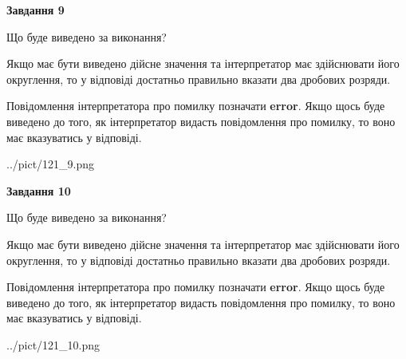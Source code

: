 \documentclass[12pt, ukrainian]{article}
\begin{document}
{\begin {Large}
{\begin {center}\textbf{Завдання 9}\end {center}}\par
Що буде виведено за виконання? \par

Якщо має бути виведено дійсне значення та інтерпретатор має здійснювати його округлення, 
то у відповіді достатньо правильно вказати два дробових розряди.

Повідомлення інтерпретатора про помилку позначати \textbf{error}.
Якщо щось буде виведено до того, як інтерпретатор видасть повідомлення про помилку, 
то воно має вказуватись у відповіді. \par

\begin{center}
	{../pict/121_9.png}
\end{center}
\newpage

{\begin {center}\textbf{Завдання 10}\end {center}}\par
Що буде виведено за виконання? \par

Якщо має бути виведено дійсне значення та інтерпретатор має здійснювати його округлення, 
то у відповіді достатньо правильно вказати два дробових розряди.

Повідомлення інтерпретатора про помилку позначати \textbf{error}.
Якщо щось буде виведено до того, як інтерпретатор видасть повідомлення про помилку, 
то воно має вказуватись у відповіді. \par

\begin{center}
	{../pict/121_10.png}
\end{center}
\newpage

\end {Large}}
\end{document}
